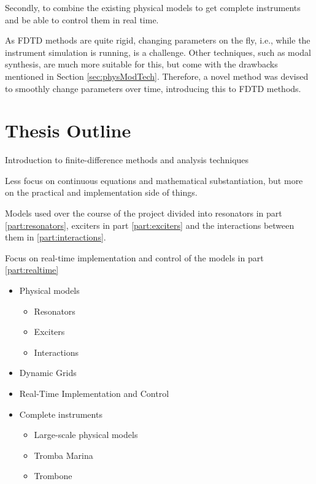 Secondly, to combine the existing physical models to get complete instruments and be able to control them in real time.

As FDTD methods are quite rigid, changing parameters on the fly, i.e., while the instrument simulation is running, is a challenge.  Other techniques, such as modal synthesis, are much more suitable for this, but come with the drawbacks mentioned in Section \ref{sec:physModTech}. Therefore, a novel method was devised to smoothly change parameters over time, introducing this to FDTD methods. 


\section{Thesis Outline}
Introduction to finite-difference methods and analysis techniques

Less focus on continuous equations and mathematical substantiation, but more on the practical and implementation side of things.

Models used over the course of the project divided into resonators in part \ref{part:resonators}, exciters in part \ref{part:exciters} and the interactions between them in \ref{part:interactions}.

Focus on real-time implementation and control of the models in part \ref{part:realtime}
\begin{itemize}
    \item Physical models
    \begin{itemize}
        \item Resonators
        \item Exciters
        \item Interactions
    \end{itemize}
    \item Dynamic Grids
    \item Real-Time Implementation and Control
    \item Complete instruments
    \begin{itemize}
        \item Large-scale physical models
        \item Tromba Marina
        \item Trombone
    \end{itemize}
\end{itemize}